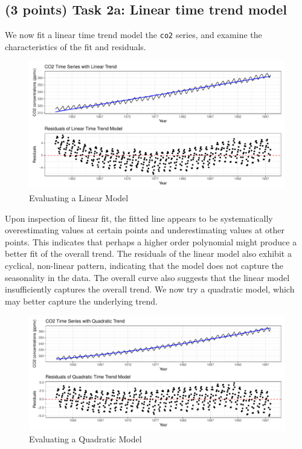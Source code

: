 \documentclass[
]{article}
\begin{document}
\newpage

\subsection{(3 points) Task 2a: Linear time trend model}\label{points-task-2a-linear-time-trend-model}

We now fit a linear time trend model the \texttt{co2} series, and examine the characteristics of the fit and residuals.

\begin{figure}

{\centering \includegraphics[width=1\linewidth]{lab_prompt_Updated_files/figure-latex/linear-model-plots-1} 

}

\caption{Evaluating a Linear Model}\label{fig:linear-model-plots}
\end{figure}

Upon inspection of linear fit, the fitted line appears to be systematically overestimating values at certain points and underestimating values at other points. This indicates that perhaps a higher order polynomial might produce a better fit of the overall trend. The residuals of the linear model also exhibit a cyclical, non-linear pattern, indicating that the model does not capture the seasonality in the data. The overall curve also suggests that the linear model insufficiently captures the overall trend. We now try a quadratic model, which may better capture the underlying trend.

\begin{figure}

{\centering \includegraphics[width=1\linewidth]{lab_prompt_Updated_files/figure-latex/quadratic-model-plots-1} 

}

\caption{Evaluating a Quadratic Model}\label{fig:quadratic-model-plots}
\end{figure}
\end{document}
